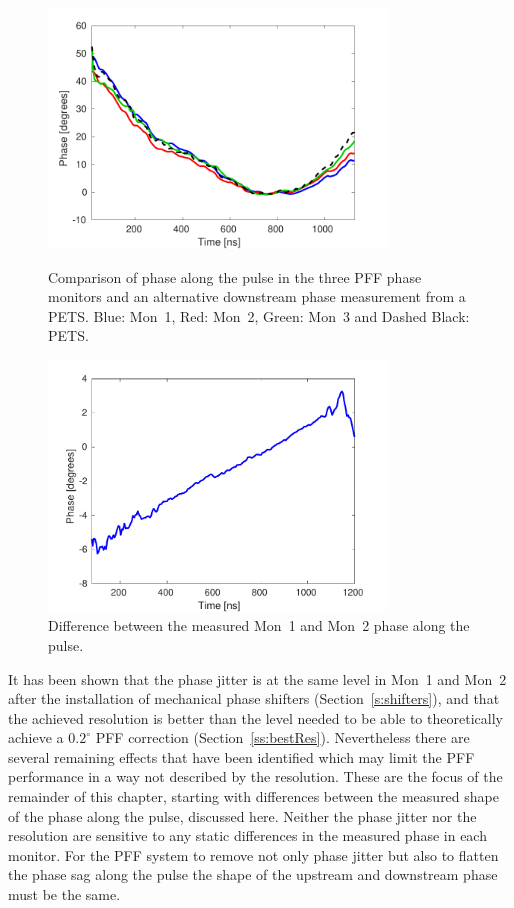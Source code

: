 \begin{figure}
  \centering
  \includegraphics[width=0.8\textwidth]{Figures/phaseMons/phaseAlongAll}
  \caption{Comparison of phase along the pulse in the three PFF phase monitors and an alternative downstream phase measurement from a PETS. Blue: Mon~1, Red: Mon~2, Green: Mon~3 and Dashed Black: PETS.}
  \label{f:phaseAlongAll}
  \includegraphics[width=0.8\textwidth]{Figures/phaseMons/DiffMon1Mon2Along}
  \caption{Difference between the measured Mon~1 and Mon~2 phase along the pulse.}
  \label{f:DiffMon1Mon2Along}
\end{figure}

It has been shown that the phase jitter is at the same level in Mon~1 and Mon~2 after the installation of mechanical phase shifters (Section~\ref{s:shifters}), and that the achieved resolution is better than the level needed to be able to theoretically achieve a \(0.2^\circ\) PFF correction (Section~\ref{ss:bestRes}). Nevertheless there are several remaining effects that have been identified which may limit the PFF performance in a way not described by the resolution. These are the focus of the remainder of this chapter, starting with differences between the measured shape of the phase along the pulse, discussed here. Neither the phase jitter nor the resolution are sensitive to any static differences in the measured phase in each monitor. For the PFF system to remove not only phase jitter but also to flatten the phase sag along the pulse the shape of the upstream and downstream phase must be the same.

